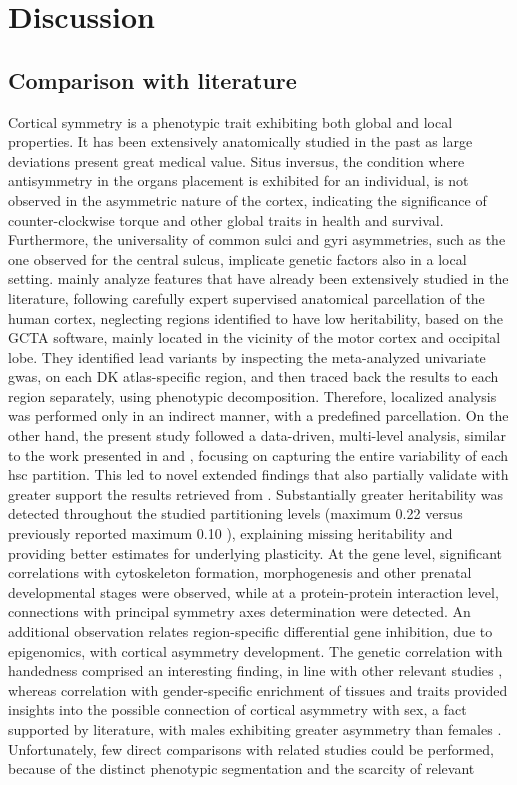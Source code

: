 \chapter{Discussion}\label{chap:discussion}

\section{Comparison with literature}
Cortical symmetry is a phenotypic trait exhibiting both global and local properties. It has been extensively anatomically studied in the past as large deviations present great medical value. Situs inversus, the condition where antisymmetry in the organs placement is exhibited for an individual, is not observed in the asymmetric nature of the cortex, indicating the significance of counter-clockwise torque and other global traits in health and survival. Furthermore, the universality of common sulci and gyri asymmetries, such as the one observed for the central sulcus, implicate genetic factors also in a local setting.  \citet{Sha2021} mainly analyze features that have already been extensively studied in the literature, following carefully expert supervised anatomical parcellation of the human cortex, neglecting regions identified to have low heritability, based on the GCTA software, mainly located in the vicinity of the motor cortex and occipital lobe. They identified lead variants by inspecting the meta-analyzed univariate \ac{gwas}, on each DK atlas-specific region, and then traced back the results to each region separately, using phenotypic decomposition\cite{Lin2020}. Therefore, localized analysis was performed only in an indirect manner, with a predefined parcellation. On the other hand, the present study followed a data-driven, multi-level analysis, similar to the work presented in \cite{Naqvi2021} and \cite{Claes2018}, focusing on capturing the entire variability of each  \ac{hsc} partition. This led to novel extended findings that also partially validate with greater support the results retrieved from \citet{Sha2021}. Substantially greater heritability was detected throughout the studied partitioning levels (maximum 0.22 versus previously reported maximum 0.10 \cite{Sha2021}), explaining missing heritability and providing better estimates for underlying plasticity. At the gene level, significant correlations with cytoskeleton formation, morphogenesis and other prenatal developmental stages were observed, while at a protein-protein interaction level, connections with principal symmetry axes determination were detected. An additional observation relates region-specific differential gene inhibition, due to epigenomics, with cortical asymmetry development. The genetic correlation with handedness comprised an interesting finding, in line with other relevant studies \cite{Kong2021}, whereas correlation with gender-specific enrichment of tissues and traits provided insights into the possible connection of cortical asymmetry with sex, a fact supported by literature, with males exhibiting greater asymmetry than females \cite{Guadalupe2015}. Unfortunately, few direct comparisons with related studies could be performed,  because of the distinct phenotypic segmentation and the scarcity of relevant 